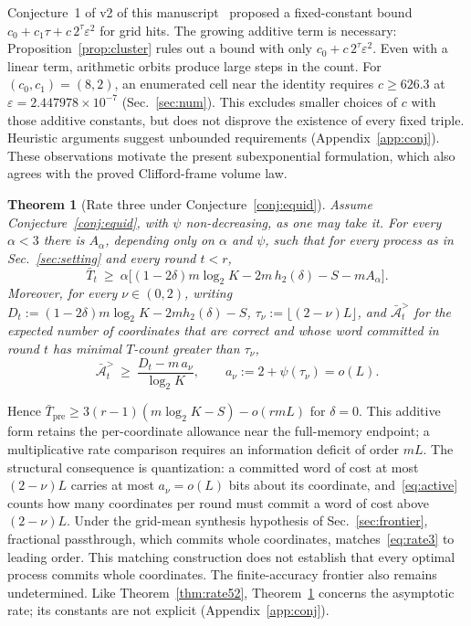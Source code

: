 \documentclass[aps,prx,twocolumn,superscriptaddress,nofootinbib,longbibliography]{revtex4-2}
\theoremstyle{plain}
\newtheorem{theorem}{Theorem}
\theoremstyle{definition}
\theoremstyle{remark}
\newcommand{\Tpre}{T_{\mathrm{pre}}}
\begin{document}
Conjecture~1 of v2 of this manuscript~\cite{ExchangeV2} proposed a fixed-constant bound $c_0+c_1\tau+c\,2^\tau\varepsilon^2$ for grid hits. The growing additive term is necessary: Proposition~\ref{prop:cluster} rules out a bound with only $c_0+c\,2^\tau\varepsilon^2$. Even with a linear term, arithmetic orbits produce large steps in the count. For $(c_0,c_1)=(8,2)$, an enumerated cell near the identity requires $c\ge626.3$ at $\varepsilon=2.447978\times10^{-7}$ (Sec.~\ref{sec:num}). This excludes smaller choices of $c$ with those additive constants, but does not disprove the existence of every fixed triple. Heuristic arguments suggest unbounded requirements (Appendix~\ref{app:conj}). These observations motivate the present subexponential formulation, which also agrees with the proved Clifford-frame volume law.


\begin{theorem}[Rate three under Conjecture~\ref{conj:equid}]\label{thm:main2}
Assume Conjecture~\ref{conj:equid}, with $\psi$ non-decreasing, as one may take it. For every $\alpha<3$ there is $A_\alpha$, depending only on $\alpha$ and $\psi$, such that for every process as in Sec.~\ref{sec:setting} and every round $t<r$,
\begin{equation}\label{eq:rate3}
\bar T_t\ \ge\ \alpha\big[(1-2\delta)m\log_2K-2m\,h_2(\delta)-S-mA_\alpha\big].
\end{equation}
Moreover, for every $\nu\in(0,2)$, writing $D_t:=(1-2\delta)m\log_2K-2mh_2(\delta)-S$, $\tau_\nu:=\lfloor(2-\nu)L\rfloor$, and $\bar{\mathcal A}^{>}_t$ for the expected number of coordinates that are correct and whose word committed in round $t$ has minimal $T$-count greater than $\tau_\nu$,
\begin{equation}\label{eq:active}
\bar{\mathcal A}^{>}_t\ \ge\ \frac{D_t-m\,a_\nu}{\log_2K},\qquad a_\nu:=2+\psi(\tau_\nu)=o(L).
\end{equation}
\end{theorem}
Hence $\bar\Tpre\ge3(r-1)(m\log_2K-S)-o(rmL)$ for $\delta=0$. This additive form retains the per-coordinate allowance near the full-memory endpoint; a multiplicative rate comparison requires an information deficit of order $mL$. The structural consequence is quantization: a committed word of cost at most $(2-\nu)L$ carries at most $a_\nu=o(L)$ bits about its coordinate, and~\eqref{eq:active} counts how many coordinates per round must commit a word of cost above $(2-\nu)L$. Under the grid-mean synthesis hypothesis of Sec.~\ref{sec:frontier}, fractional passthrough, which commits whole coordinates, matches~\eqref{eq:rate3} to leading order. This matching construction does not establish that every optimal process commits whole coordinates. The finite-accuracy frontier also remains undetermined. Like Theorem~\ref{thm:rate52}, Theorem~\ref{thm:main2} concerns the asymptotic rate; its constants are not explicit (Appendix~\ref{app:conj}).
\end{document}
